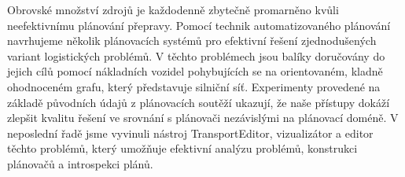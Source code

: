 \documentclass[12pt,a4paper]{article}
\begin{document}
\raggedright
\noindent Obrovské množství zdrojů je každodenně zbytečně promarněno kvůli neefektivnímu plánování přepravy.
Pomocí technik automatizovaného plánování navrhujeme několik plánovacích systémů pro efektivní řešení zjednodušených variant logistických problémů.
V těchto problémech jsou balíky doručovány do jejich cílů
pomocí nákladních vozidel pohybujících se na orientovaném, kladně ohodnoceném grafu, který představuje silniční síť.
Experimenty provedené na základě původních údajů z plánovacích soutěží ukazují, že naše přístupy dokáží zlepšit kvalitu řešení ve srovnání s plánovači nezávislými na plánovací doméně.
V neposlední řadě jsme vyvinuli nástroj TransportEditor, vizualizátor a editor těchto problémů, který umožňuje efektivní analýzu problémů, konstrukci plánovačů a introspekci plánů.
\end{document}

